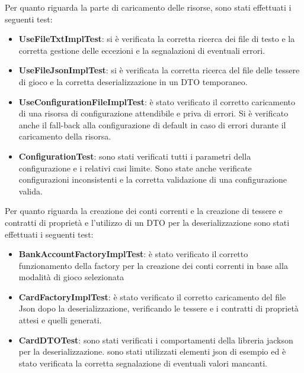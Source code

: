 Per quanto riguarda la parte di caricamento delle risorse, sono stati effettuati i seguenti test:\newline
\begin{itemize}
    \item \textbf{UseFileTxtImplTest}: si è verificata la corretta ricerca dei file di testo e la corretta gestione delle eccezioni e la segnalazioni di eventuali errori.
    \item \textbf{UseFileJsonImplTest}: si è verificata la corretta ricerca del file delle tessere di gioco e la corretta deserializzazione in un DTO temporaneo.
    \item \textbf{UseConfigurationFileImplTest}: è stato verificato il corretto caricamento di una risorsa di configurazione attendibile e priva di errori. Si è verificato anche il fall-back alla configurazione di default in caso di errori durante il caricamento della risorsa.
    \item \textbf{ConfigurationTest}: sono stati verificati tutti i parametri della configurazione e i relativi casi limite. Sono state anche verificate configurazioni inconsistenti e la corretta validazione di una configurazione valida.
\end{itemize}
Per quanto riguarda la creazione dei conti correnti e la creazione di tessere e contratti di proprietà e l'utilizzo di un DTO per la deserializzazione sono stati effettuati i seguenti test:\newline
\begin{itemize}
    \item \textbf{BankAccountFactoryImplTest}: è stato verificato il corretto funzionamento della factory per la creazione dei conti correnti in base alla modalità di gioco selezionata
    \item \textbf{CardFactoryImplTest}: è stato verificato il corretto caricamento del file Json dopo la deserializzazione, verificando le tessere e i contratti di proprietà attesi e quelli generati.
    \item \textbf{CardDTOTest}: sono stati verificati i comportamenti della libreria jackson per la deserializzazione. sono stati utilizzati elementi json di esempio ed è stato verificata la corretta segnalazione di eventuali valori mancanti.
\end{itemize}

